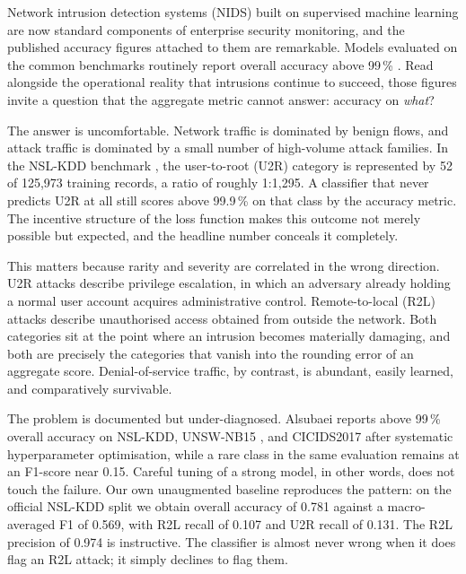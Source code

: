 \documentclass[11pt]{article}
\newcommand{\baseAcc}{0.781}          %
\newcommand{\baseMacroF}{0.569}       %
\newcommand{\baseRtwolRec}{0.107}     %
\newcommand{\baseRtwolPrec}{0.974}    %
\newcommand{\baseUtwrRec}{0.131}      %
\newcommand{\trainRows}{125{,}973}
\newcommand{\utwrTrain}{52}
\newcommand{\utwrRatio}{1{:}1{,}295}
\begin{document}
Network intrusion detection systems (NIDS) built on supervised
machine learning are now standard components of enterprise security monitoring,
and the published accuracy figures attached to them are remarkable. Models
evaluated on the common benchmarks routinely report overall accuracy above
99\,\% \cite{alsubaei2025smart}. Read alongside the operational
reality that intrusions continue to succeed, those figures invite a question
that the aggregate metric cannot answer: accuracy on \emph{what}?

The answer is uncomfortable. Network traffic is dominated by benign flows, and
attack traffic is dominated by a small number of high-volume attack families.
In the NSL-KDD benchmark \cite{tavallaee2009detailed}, the user-to-root (U2R)
category is represented by \utwrTrain{} of \trainRows{} training records, a ratio
of roughly \utwrRatio{}. A classifier that never predicts U2R at all still scores
above 99.9\,\% on that class by the accuracy metric. The incentive structure of
the loss function makes this outcome not merely possible but expected, and the
headline number conceals it completely.

This matters because rarity and severity are correlated in the wrong direction.
U2R attacks describe privilege escalation, in which an adversary already holding
a normal user account acquires administrative control. Remote-to-local (R2L)
attacks describe unauthorised access obtained from outside the network. Both
categories sit at the point where an intrusion becomes materially damaging, and
both are precisely the categories that vanish into the rounding error of an
aggregate score. Denial-of-service traffic, by contrast, is abundant, easily
learned, and comparatively survivable.

The problem is documented but under-diagnosed. Alsubaei \cite{alsubaei2025smart}
reports above 99\,\% overall accuracy on NSL-KDD, UNSW-NB15
\cite{moustafa2015unsw}, and CICIDS2017 \cite{sharafaldin2018toward} after
systematic hyperparameter optimisation, while a rare class in the same
evaluation remains at an F1-score near 0.15. Careful tuning of a strong model,
in other words, does not touch the failure. Our own unaugmented baseline
reproduces the pattern: on the official NSL-KDD split we obtain overall accuracy
of \baseAcc{} against a macro-averaged F1 of \baseMacroF{}, with R2L recall of
\baseRtwolRec{} and U2R recall of \baseUtwrRec{}. The R2L precision of
\baseRtwolPrec{} is instructive. The classifier is almost never wrong when it
does flag an R2L attack; it simply declines to flag them.
\end{document}

